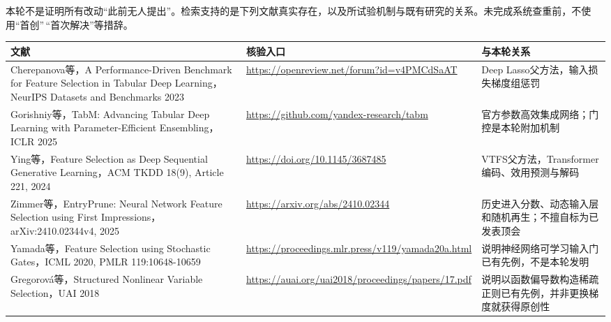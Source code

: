 \documentclass[UTF8,11pt,a4paper]{ctexart}
\begin{document}
本轮不是证明所有改动``此前无人提出''。检索支持的是下列文献真实存在，以及所试验机制与既有研究的关系。未完成系统查重前，不使用``首创''\,``首次解决''等措辞。

{\def\LTcaptype{none} %
{
\footnotesize
\begin{longtable}[]{@{}
  >{\raggedright\arraybackslash}p{}
  >{\raggedright\arraybackslash}p{}
  >{\raggedright\arraybackslash}p{}@{}}
\toprule\noalign{}
\begin{minipage}[b]{\linewidth}\raggedright
文献
\end{minipage} & \begin{minipage}[b]{\linewidth}\raggedright
核验入口
\end{minipage} & \begin{minipage}[b]{\linewidth}\raggedright
与本轮关系
\end{minipage} \\
\midrule\noalign{}
\endhead
\bottomrule\noalign{}
\endlastfoot
Cherepanova等，A Performance-Driven Benchmark for Feature Selection in Tabular Deep Learning，NeurIPS Datasets and Benchmarks 2023 & \url{https://openreview.net/forum?id=v4PMCdSaAT} & Deep Lasso父方法，输入损失梯度组惩罚 \\
Gorishniy等，TabM: Advancing Tabular Deep Learning with Parameter-Efficient Ensembling，ICLR 2025 & \url{https://github.com/yandex-research/tabm} & 官方参数高效集成网络；门控是本轮附加机制 \\
Ying等，Feature Selection as Deep Sequential Generative Learning，ACM TKDD 18(9), Article 221, 2024 & \url{https://doi.org/10.1145/3687485} & VTFS父方法，Transformer编码、效用预测与解码 \\
Zimmer等，EntryPrune: Neural Network Feature Selection using First Impressions，arXiv:2410.02344v4, 2025 & \url{https://arxiv.org/abs/2410.02344} & 历史进入分数、动态输入层和随机再生；不擅自标为已发表顶会 \\
Yamada等，Feature Selection using Stochastic Gates，ICML 2020, PMLR 119:10648-10659 & \url{https://proceedings.mlr.press/v119/yamada20a.html} & 说明神经网络可学习输入门已有先例，不是本轮发明 \\
Gregorová等，Structured Nonlinear Variable Selection，UAI 2018 & \url{https://auai.org/uai2018/proceedings/papers/17.pdf} & 说明以函数偏导数构造稀疏正则已有先例，并非更换梯度就获得原创性 \\
\end{longtable}
}
}
\end{document}
